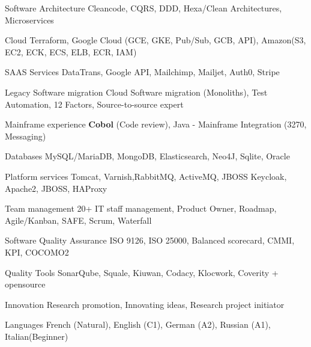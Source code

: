 \begin{cvskills}


  \cvskill
  {Software Architecture} %
  {Cleancode, CQRS, DDD, Hexa/Clean Architectures, Microservices} %

  \cvskill
  {Cloud} %
  {Terraform, Google Cloud (GCE, GKE, Pub/Sub, GCB, API), Amazon(S3, EC2, ECK, ECS, ELB, ECR, IAM)} %

  \cvskill
  {SAAS Services} %
  {DataTrans, Google API, Mailchimp, Mailjet, Auth0, Stripe} %


  \cvskill
  {Legacy Software migration} %
  {Cloud Software migration (Monoliths), Test Automation, 12 Factors, Source-to-source expert} %
  
  \cvskill
  {Mainframe experience} %
  {\textbf{Cobol} (Code review), Java - Mainframe Integration (3270, Messaging)} %


  \cvskill
  {Databases} %
  {MySQL/MariaDB, MongoDB, Elasticsearch, Neo4J, Sqlite, Oracle} %
  

  \cvskill
  {Platform services} %
  {Tomcat, Varnish,RabbitMQ, ActiveMQ, JBOSS Keycloak, Apache2, JBOSS, HAProxy} %

\end{cvskills}




\begin{cvskills}


  \cvskill
  {Team management} %
  {20+ IT staff management, Product Owner, Roadmap, Agile/Kanban, SAFE, Scrum, Waterfall} %


  \cvskill
  {Software Quality Assurance} %
  {ISO 9126, ISO 25000, Balanced scorecard, CMMI, KPI, COCOMO2} %

  \cvskill
  {Quality Tools} %
  {SonarQube, Squale, Kiuwan, Codacy, Klocwork, Coverity + opensource} %


  \cvskill
  {Innovation} %
  {Research promotion, Innovating ideas, Research project initiator} %

  \cvskill
  {Languages} %
  {French (Natural), English (C1), German (A2), Russian (A1), Italian(Beginner)} %

  \end{cvskills}
